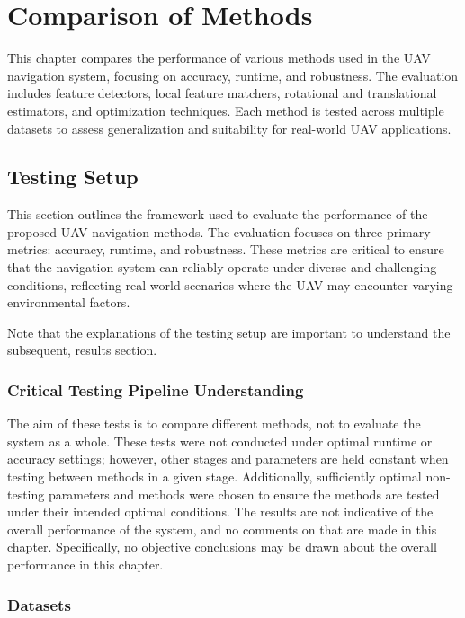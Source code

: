 \chapter{Comparison of Methods}
\label{chap:Testing}

This chapter compares the performance of various methods used in the UAV navigation system, focusing on accuracy, runtime, and robustness. The evaluation includes feature detectors, local feature matchers, rotational and translational estimators, and optimization techniques. Each method is tested across multiple datasets to assess generalization and suitability for real-world UAV applications.

\section{Testing Setup}

This section outlines the framework used to evaluate the performance of the proposed UAV navigation methods. The evaluation focuses on three primary metrics: accuracy, runtime, and robustness. These metrics are critical to ensure that the navigation system can reliably operate under diverse and challenging conditions, reflecting real-world scenarios where the UAV may encounter varying environmental factors.

Note that the explanations of the testing setup are important to understand the subsequent, results section. 

\subsection{Critical Testing Pipeline Understanding}

The aim of these tests is to compare different methods, not to evaluate the system as a whole. These tests were not conducted under optimal runtime or accuracy settings; however, other stages and parameters are held constant when testing between methods in a given stage. Additionally, sufficiently optimal non-testing parameters and methods were chosen to ensure the methods are tested under their intended optimal conditions. The results are not indicative of the overall performance of the system, and no comments on that are made in this chapter. Specifically, no objective conclusions may be drawn about the overall performance in this chapter.

\subsection{Datasets}

